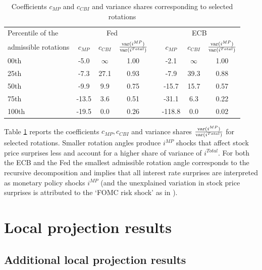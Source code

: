 \documentclass[a4paper,12pt]{article}
\begin{document}
\begin{table}[!htbp]
\begin{center}
\caption{Coefficients $c_{MP}$ and $c_{CBI}$ and variance shares corresponding to selected rotations}\label{tab: rotations}
\begin{tabular}{lccccccc}
\toprule
Percentile of the   & \multicolumn{3}{c}{Fed} & & \multicolumn{3}{c}{ECB}  \\
admissible rotations & $c_{MP}$ & $c_{CBI}$ & $\frac{\operatorname{var}(i^{MP})}{\operatorname{var}(i^{Total})}$ & & $c_{MP}$ & $c_{CBI}$ & $\frac{\operatorname{var}(i^{MP})}{\operatorname{var}(i^{Total})}$\\
\midrule
00th & -5.0 & $\infty$ & 1.00 &   & -2.1 & $\infty$ & 1.00 \\
25th & -7.3 & 27.1 & 0.93 &   & -7.9 & 39.3 & 0.88 \\
50th & -9.9 & 9.9 & 0.75 &   &-15.7 & 15.7 & 0.57 \\
75th & -13.5 & 3.6 & 0.51 &   &-31.1 & 6.3 & 0.22 \\
100th & -19.5 & 0.0 & 0.26 &   & -118.8 & 0.0 & 0.02 \\
\bottomrule
\end{tabular}
\end{center}
\end{table}

Table \ref{tab: rotations} reports the coefficients $c_{MP},c_{CBI}$ and variance shares $\frac{\operatorname{var}(i^{MP})}{\operatorname{var}(i^{Total})}$ for selected rotations. 
Smaller rotation angles produce $i^{MP}$ shocks that affect stock price surprises less and account for a higher share of variance of $i^{Total}$.
For both the ECB and the Fed the smallest admissible rotation angle corresponds to the recursive decomposition and implies that all interest rate surprises are interpreted as monetary policy shocks $i^{MP}$ (and the unexplained variation in stock price surprises is attributed to the `FOMC risk shock' as in \citealt{Kroencke_etal_2021}).

\section{Local projection results}

\subsection{Additional local projection results}

\renewcommand\textfraction{.02}
\end{document}
